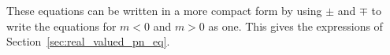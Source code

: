 \documentclass{egpubl}
\begin{document}
These equations can be written in a more compact form by using $\pm$ and $\mp$ to write the equations for $m<0$ and $m>0$ as one. This gives the expressions of Section~\ref{sec:real_valued_pn_eq}.

\end{document}
